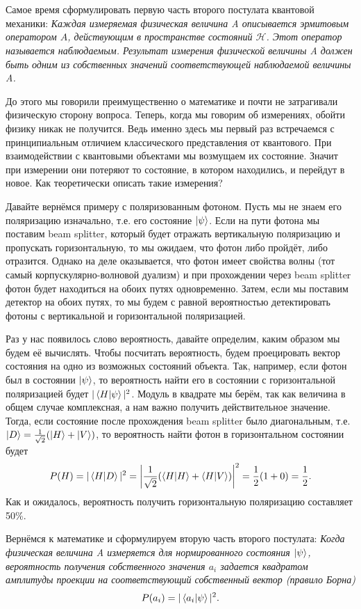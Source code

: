 Самое время сформулировать первую часть второго постулата квантовой механики: \textit{Каждая измеряемая физическая величина A описывается эрмитовым оператором $\hat{A}$, действующим в пространстве состояний $\mathcal{H}$. Этот оператор называется наблюдаемым. Результат измерения физической величины A должен быть одним из собственных значений соответствующей наблюдаемой величины A.}

До этого мы говорили преимущественно о математике и почти не затрагивали физическую сторону вопроса. Теперь, когда мы говорим об измерениях, обойти физику никак не получится. Ведь именно здесь мы первый раз встречаемся с принципиальным отличием классического представления от квантового. При взаимодействии с квантовыми объектами мы возмущаем их состояние. Значит при измерении они потеряют то состояние, в котором находились, и перейдут в новое. Как теоретически описать такие измерения? 

Давайте вернёмся примеру с поляризованным фотоном. Пусть мы не знаем его поляризацию изначально, т.е. его состояние $\ket{\psi}$. Если на пути фотона мы поставим beam splitter, который будет отражать вертикальную поляризацию и пропускать горизонтальную, то мы ожидаем, что фотон либо пройдёт, либо отразится. Однако на деле оказывается, что фотон имеет свойства волны (тот самый корпускулярно-волновой дуализм) и при прохождении через beam splitter фотон будет находиться на обоих путях одновременно. Затем, если мы поставим детектор на обоих путях, то мы будем с равной вероятностью детектировать фотоны с вертикальной и горизонтальной поляризацией. 

Раз у нас появилось слово вероятность, давайте определим, каким образом мы будем её вычислять. Чтобы посчитать вероятность, будем проецировать вектор состояния на одно из возможных состояний объекта. Так, например, если фотон был в состоянии $\ket{\psi}$, то вероятность найти его в состоянии с горизонтальной поляризацией будет $|\bra{H}\ket{\psi}|^2$. Модуль в квадрате мы берём, так как величина в общем случае комплексная, а нам важно получить действительное значение. Тогда, если состояние после прохождения beam splitter было диагональным, т.е. $\ket{D} = \frac{1}{\sqrt{2}}(\ket{H} + \ket{V})$, то вероятность найти фотон в горизонтальном состоянии будет
\[
P(H) = |\bra{H}\ket{D}|^2 = \left|\frac{1}{\sqrt{2}} (\bra{H}\ket{H} + \bra{H}\ket{V})\right|^2 = \frac{1}{2}(1 + 0) = \frac{1}{2}.
\]
Как и ожидалось, вероятность получить горизонтальную поляризацию составляет 50\%.

Вернёмся к математике и сформулируем вторую часть второго постулата: \textit{Когда физическая величина A измеряется для нормированного состояния $\ket{\psi}$, вероятность получения собственного значения $a_i$ задается квадратом амплитуды проекции на соответствующий собственный вектор (правило Борна)}
\[
P(a_i) = |\bra{a_i}\ket{\psi}|^2.
\]


